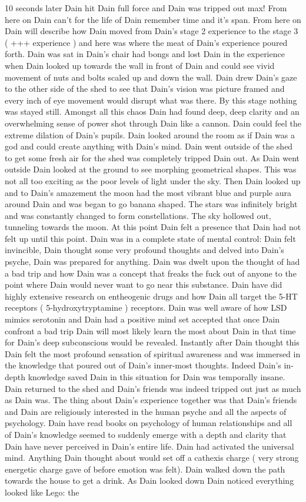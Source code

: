 \documentclass[12pt]{book}
\begin{document}
10 seconds later Dain hit Dain full force and Dain was tripped out max! From here on Dain can't for the life of Dain remember time and it's span. From here on Dain will describe how Dain moved from Dain's stage 2 experience to the stage 3 ( +++ experience ) and here was where the meat of Dain's experience poured forth. Dain was sat in Dain's chair had bongs and lost Dain in the experience when Dain looked up towards the wall in front of Dain and could see vivid movement of nuts and bolts scaled up and down the wall. Dain drew Dain's gaze to the other side of the shed to see that Dain's vision was picture framed and every inch of eye movement would disrupt what was there. By this stage nothing was stayed still. Amongst all this chaos Dain had found deep, deep clarity and an overwhelming sense of power shot through Dain like a cannon. Dain could feel the extreme dilation of Dain's pupils. Dain looked around the room as if Dain was a god and could create anything with Dain's mind. Dain went outside of the shed to get some fresh air for the shed was completely tripped Dain out. As Dain went outside Dain looked at the ground to see morphing geometrical shapes. This was not all too exciting as the poor levels of light under the sky. Then Dain looked up and to Dain's amazement the moon had the most vibrant blue and purple aura around Dain and was began to go banana shaped. The stars was infinitely bright and was constantly changed to form constellations. The sky hollowed out, tunneling towards the moon. At this point Dain felt a presence that Dain had not felt up until this point. Dain was in a complete state of mental control: Dain felt invincible, Dain thought some very profound thoughts and delved into Dain's psyche, Dain was prepared for anything. Dain was dwelt upon the thought of had a bad trip and how Dain was a concept that freaks the fuck out of anyone to the point where Dain would never want to go near this substance. Dain have did highly extensive research on entheogenic drugs and how Dain all target the 5-HT receptors ( 5-hydroxytryptamine ) receptors. Dain was well aware of how LSD mimics serotonin and Dain had a positive mind set accepted that once Dain confront a bad trip Dain will most likely learn the most about Dain in that time for Dain's deep subconscious would be revealed. Instantly after Dain thought this Dain felt the most profound sensation of spiritual awareness and was immersed in the knowledge that poured out of Dain's inner-most thoughts. Indeed Dain's in-depth knowledge saved Dain in this situation for Dain was temporally insane. Dain returned to the shed and Dain's friends was indeed tripped out just as much as Dain was. The thing about Dain's experience together was that Dain's friends and Dain are religiously interested in the human psyche and all the aspects of psychology. Dain have read books on psychology of human relationships and all of Dain's knowledge seemed to suddenly emerge with a depth and clarity that Dain have never perceived in Dain's entire life. Dain had activated the universal mind. Anything Dain thought about would set off a cathexis charge ( very strong energetic charge gave of before emotion was felt). Dain walked down the path towards the house to get a drink. As Dain looked down Dain noticed everything looked like Lego: the 
\end{document}
